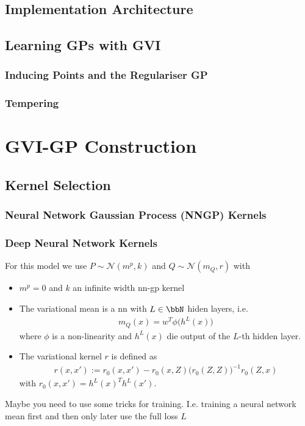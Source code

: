 \documentclass{article}
\numberwithin{equation}{section}
\begin{document}
\subsection{Implementation Architecture}
\subsection{Learning GPs with GVI}
\subsubsection{Inducing Points and the Regulariser GP}
\subsubsection{Tempering}


\newpage
\section{GVI-GP Construction}
\subsection{Kernel Selection}
\subsubsection{Neural Network Gaussian Process (NNGP) Kernels}
\subsubsection{Deep Neural Network Kernels}
For this model we use $P \sim \mathcal{N}(m^p, k) $ and $Q \sim \mathcal{N}(m_Q, r)$ with 
\begin{itemize}
    \item $m^p = 0$ and $k$ an infinite width nn-gp kernel
    \item The variational mean is a nn with $L \in \bbN$ hiden layers, i.e. 
    \begin{align}
        m_Q(x) = w^T \phi\big( h^{L}(x) \big)
    \end{align}
    where $\phi$ is a non-linearity and $h^L(x)$ die output of the $L$-th hidden layer. 
    \item 
    The variational kernel $r$ is defined as 
    \begin{align}
        r(x,x') := r_0(x,x') - r_0(x,Z) \big( r_0(Z,Z) \big)^{-1} r_0(Z,x)
    \end{align}
    with $r_0(x,x') = h^{L}(x)^T h^{L}(x')$.
\end{itemize}
Maybe you need to use some tricks for training. I.e. training a neural network mean first and then only later use the full loss $L$
\end{document}
